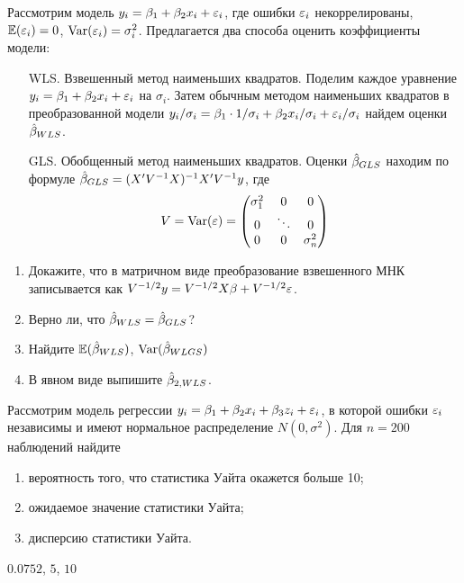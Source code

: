 \begin{problem}
Рассмотрим модель $y_i=\beta_1+\beta_2 x_i+\varepsilon_i$, где ошибки $\varepsilon_i$ некоррелированы, $\mathbb{E}(\varepsilon_i)=0$, $\operatorname{Var}(\varepsilon_i)=\sigma^2_i$. Предлагается два способа оценить коэффициенты модели:
\begin{enumerate}
\item[WLS.] Взвешенный метод наименьших квадратов. Поделим каждое уравнение $y_i=\beta_1+\beta_2 x_i+\varepsilon_i$ на $\sigma_i$. Затем обычным методом наименьших квадратов в преобразованной модели $y_i/\sigma_i=\beta_1\cdot 1/\sigma_i+\beta_2 x_i/\sigma_i+\varepsilon_i/\sigma_i$ найдем оценки $\hat{\beta}_{WLS}$.
\item[GLS.] Обобщенный метод наименьших квадратов. Оценки $\hat{\beta}_{GLS}$ находим по формуле $\hat{\beta}_{GLS}=(X'V^{-1}X)^{-1}X'V^{-1}y$, где
\[
V=\operatorname{Var}(\varepsilon)=\begin{pmatrix}
\sigma^2_1 & 0 & 0 \\
0 & \ddots & 0 \\
0 & 0 & \sigma^2_n
\end{pmatrix}
\]
\end{enumerate}
\begin{enumerate}
\item Докажите, что в матричном виде преобразование взвешенного МНК записывается как $V^{-1/2}y=V^{-1/2}X\beta+V^{-1/2}\varepsilon$.
\item Верно ли, что $\hat{\beta}_{WLS}=\hat{\beta}_{GLS}$?
\item Найдите $\mathbb{E}(\hat{\beta}_{WLS})$, $\operatorname{Var}(\hat{\beta}_{WLGS})$
\item В явном виде выпишите $\hat{\beta}_{2,WLS}$.
\end{enumerate}


\begin{sol}
\end{sol}
\end{problem}




\begin{problem}
Рассмотрим модель регрессии $y_i=\beta_1+\beta_2 x_i + \beta_3 z_i+\varepsilon_i$, в которой
ошибки $\varepsilon_i$ независимы и имеют нормальное распределение $N(0,\sigma^2)$. Для $n = 200$ наблюдений найдите
\begin{enumerate}
\item вероятность того, что статистика Уайта окажется больше 10;
\item ожидаемое значение статистики Уайта;
\item дисперсию статистики Уайта.
\end{enumerate}


\begin{sol}
$0.0752$, $5$, $10$
\end{sol}
\end{problem}


